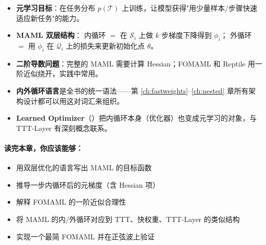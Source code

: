 \begin{itemize}
  \item \textbf{元学习目标}：在任务分布 $p(\mathcal{T})$ 上训练，让模型获得"用少量样本/步骤快速适应新任务"的能力。

  \item \textbf{MAML 双层结构}：
        内循环 $=$ 在 $\mathcal{S}_i$ 上做 $k$ 步梯度下降得到 $\phi_i$；
        外循环 $=$ 用 $\phi_i$ 在 $\mathcal{Q}_i$ 上的损失来更新初始化点 $\theta$。

  \item \textbf{二阶导数问题}：完整的 MAML 需要计算 Hessian；FOMAML 和 Reptile 用一阶近似绕开，实践中常用。

  \item \textbf{内外循环语言}是全书的统一语法——第 \ref{ch:fastweights}--\ref{ch:nested} 章所有架构设计都可以用这对词汇来组织。

  \item \textbf{Learned Optimizer}（\citeauthor{andrychowicz2016l2l}）把内循环本身（优化器）也变成元学习的对象，与 TTT-Layer 有深刻概念联系。
\end{itemize}

\paragraph{读完本章，你应该能够：}
\begin{itemize}
  \item 用双层优化的语言写出 MAML 的目标函数
  \item 推导一步内循环后的元梯度（含 Hessian 项）
  \item 解释 FOMAML 的一阶近似合理性
  \item 将 MAML 的内/外循环对应到 TTT、快权重、TTT-Layer 的类似结构
  \item 实现一个最简 FOMAML 并在正弦波上验证
\end{itemize}
